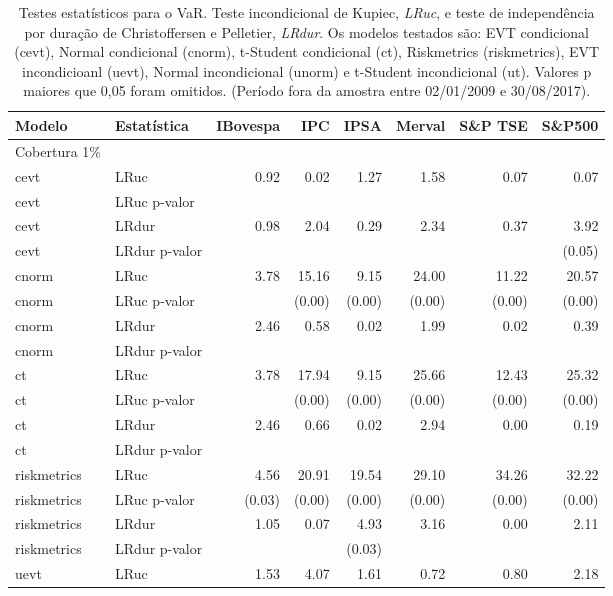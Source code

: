 \begin{longtable}{llrrrrrr}
\caption{Testes estatísticos para o VaR. Teste incondicional de Kupiec, \emph{LRuc}, e teste de
             independência por duração de Christoffersen e Pelletier, \emph{LRdur}. Os modelos testados
são: EVT condicional (cevt), Normal condicional (cnorm), t-Student condicional (ct), Riskmetrics 
(riskmetrics), EVT incondicioanl (uevt), Normal incondicional (unorm) e t-Student incondicional (ut).
Valores p maiores que 0,05 foram omitidos. (Período fora da amostra entre 02/01/2009 e 30/08/2017).} \\ 
  \hline
Modelo & Estatística & IBovespa & IPC & IPSA & Merval & S\&P TSE & S\&P500 \\ 
  \hline
Cobertura 1\% &  &  &  &  &  &  &  \\ 
  cevt & LRuc & 0.92 & 0.02 & 1.27 & 1.58 & 0.07 & 0.07 \\ 
  cevt & LRuc p-valor &  &  &  &  &  &  \\ 
  cevt & LRdur & 0.98 & 2.04 & 0.29 & 2.34 & 0.37 & 3.92 \\ 
  cevt & LRdur p-valor &  &  &  &  &  & (0.05) \\ 
  cnorm & LRuc & 3.78 & 15.16 & 9.15 & 24.00 & 11.22 & 20.57 \\ 
  cnorm & LRuc p-valor &  & (0.00) & (0.00) & (0.00) & (0.00) & (0.00) \\ 
  cnorm & LRdur & 2.46 & 0.58 & 0.02 & 1.99 & 0.02 & 0.39 \\ 
  cnorm & LRdur p-valor &  &  &  &  &  &  \\ 
  ct & LRuc & 3.78 & 17.94 & 9.15 & 25.66 & 12.43 & 25.32 \\ 
  ct & LRuc p-valor &  & (0.00) & (0.00) & (0.00) & (0.00) & (0.00) \\ 
  ct & LRdur & 2.46 & 0.66 & 0.02 & 2.94 & 0.00 & 0.19 \\ 
  ct & LRdur p-valor &  &  &  &  &  &  \\ 
  riskmetrics & LRuc & 4.56 & 20.91 & 19.54 & 29.10 & 34.26 & 32.22 \\ 
  riskmetrics & LRuc p-valor & (0.03) & (0.00) & (0.00) & (0.00) & (0.00) & (0.00) \\ 
  riskmetrics & LRdur & 1.05 & 0.07 & 4.93 & 3.16 & 0.00 & 2.11 \\ 
  riskmetrics & LRdur p-valor &  &  & (0.03) &  &  &  \\ 
  uevt & LRuc & 1.53 & 4.07 & 1.61 & 0.72 & 0.80 & 2.18 \\ 

\end{longtable}
